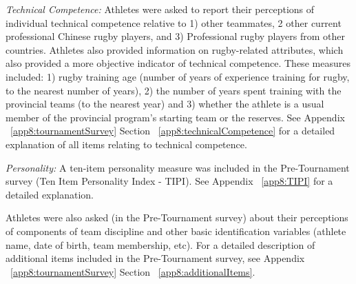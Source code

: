 \begin{CJK}{UTF8}{gbsn}
\textit{Technical Competence:} Athletes were asked to report their perceptions of individual technical competence relative to 1) other teammates, 2 other current professional Chinese rugby players, and  3) Professional rugby players from other countries.  Athletes also provided information on rugby-related attributes, which also provided a more objective indicator of technical competence.  These measures included: 1) rugby training age (number of years of experience training for rugby, to the nearest number of years), 2) the number of years spent training with the provincial teams (to the nearest year) and 3) whether the athlete is a usual member of the provincial program's starting team or the reserves.  See Appendix ~\ref{app8:tournamentSurvey} Section ~\ref{app8:technicalCompetence} for a detailed explanation of all items relating to technical competence.

\textit{Personality:} A ten-item personality measure was included in the Pre-Tournament survey (Ten Item Personality Index - TIPI)\citep{Gosling2003}. See Appendix ~\ref{app8:TIPI} for a detailed explanation.

Athletes were also asked (in the Pre-Tournament survey) about their perceptions of components of team discipline and other basic identification variables (athlete name, date of birth, team membership, etc).  For a detailed description of additional items included in the Pre-Tournament survey, see Appendix ~\ref{app8:tournamentSurvey} Section ~\ref{app8:additionalItems}.








\end{CJK}
